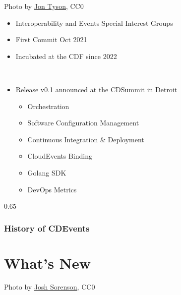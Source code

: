 \documentclass[aspectratio=169,11pt,hyperref={colorlinks=true}]{beamer}
\begin{document}
\begin{lgrayframerpic}{%
  Photo by \href{https://unsplash.com/@jontyson}{\underline{Jon Tyson}}, CC0
  }%
  {%
  \begin{itemize}
    \item Interoperability and Events Special Interest Groups
    \item First Commit Oct 2021
    \item Incubated at the CDF since 2022
  \end{itemize}
  ~\\
  \begin{itemize}
    \item Release v0.1 announced at the CDSummit in Detroit
    \begin{itemize}
      \item Orchestration
      \item Software Configuration Management
      \item Continuous Integration \& Deployment
      \item CloudEvents Binding
      \item Golang SDK
      \item DevOps Metrics
    \end{itemize}
  \end{itemize}
  }%
  {0.65}
  \frametitle{History of CDEvents}
\end{lgrayframerpic}

\section{What's New}
\begin{sectionwithpiclargecentral}{Photo by \href{https://unsplash.com/@joshsorenson}{\underline{Josh Sorenson}}, CC0}
\end{sectionwithpiclargecentral}
\end{document}

